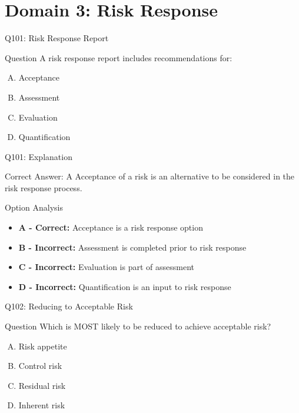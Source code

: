 \documentclass{beamer}
\begin{document}
	
	\section{Domain 3: Risk Response}
	
	\begin{frame}{Q101: Risk Response Report}
		\begin{block}{Question}
			A risk response report includes recommendations for:
		\end{block}
		\begin{enumerate}[(A)]
			\item Acceptance
			\item Assessment
			\item Evaluation
			\item Quantification
		\end{enumerate}
	\end{frame}
	
	\begin{frame}{Q101: Explanation}
		\begin{block}{Correct Answer: A}
			Acceptance of a risk is an alternative to be considered in the risk response process.
		\end{block}
		\begin{block}{Option Analysis}
			\begin{itemize}
				\item \textbf{A - Correct:} Acceptance is a risk response option
				\item \textbf{B - Incorrect:} Assessment is completed prior to risk response
				\item \textbf{C - Incorrect:} Evaluation is part of assessment
				\item \textbf{D - Incorrect:} Quantification is an input to risk response
			\end{itemize}
		\end{block}
	\end{frame}
	
	\begin{frame}{Q102: Reducing to Acceptable Risk}
		\begin{block}{Question}
			Which is MOST likely to be reduced to achieve acceptable risk?
		\end{block}
		\begin{enumerate}[(A)]
			\item Risk appetite
			\item Control risk
			\item Residual risk
			\item Inherent risk
		\end{enumerate}
	\end{frame}
	
\end{document}

